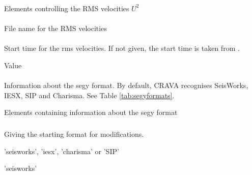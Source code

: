 \subsubsection{}
 \slist
   \item \Description Elements controlling the RMS velocities $U^2$
   \item \Argument 
   \item \Default 
 \elist

\paragraph{}
 \slist
   \item \Description File name for the RMS velocities
   \item \Argument
   \item \Default
 \elist

\paragraph{}
 \slist
   \item \Description Start time for the rms velocities. If not given, the start time is taken from .
   \item \Argument Value
   \item \Default
 \elist

\paragraph{}
 \slist
   \item \Description Information about the segy format. By default, CRAVA recognises SeisWorks, IESX, SIP and Charisma. See Table \ref{tab:segyformats}.
   \item \Argument Elements containing information about the segy format
   \item \Default
 \elist

\subparagraph{}
 \slist
   \item \Description Giving the starting format for modifications.
   \item \Argument 'seisworks', 'iesx', 'charisma' or 'SIP'
   \item \Default 'seisworks'
 \elist

